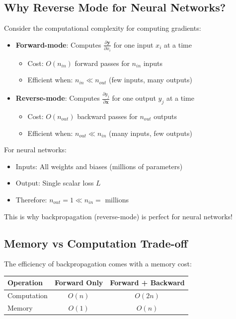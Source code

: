 \documentclass{article}
\begin{document}
\subsection{Why Reverse Mode for Neural Networks?}

Consider the computational complexity for computing gradients:
\begin{itemize}
\item \textbf{Forward-mode}: Computes $\frac{\partial \mathbf{y}}{\partial x_i}$ for one input $x_i$ at a time
\begin{itemize}
\item Cost: $O(n_{in})$ forward passes for $n_{in}$ inputs
\item Efficient when: $n_{in} \ll n_{out}$ (few inputs, many outputs)
\end{itemize}
\item \textbf{Reverse-mode}: Computes $\frac{\partial y_j}{\partial \mathbf{x}}$ for one output $y_j$ at a time
\begin{itemize}
\item Cost: $O(n_{out})$ backward passes for $n_{out}$ outputs
\item Efficient when: $n_{out} \ll n_{in}$ (many inputs, few outputs)
\end{itemize}
\end{itemize}

For neural networks:
\begin{itemize}
\item Inputs: All weights and biases (millions of parameters)
\item Output: Single scalar loss $L$
\item Therefore: $n_{out} = 1 \ll n_{in} = $ millions
\end{itemize}

This is why backpropagation (reverse-mode) is perfect for neural networks!

\subsection{Memory vs Computation Trade-off}

The efficiency of backpropagation comes with a memory cost:

\begin{center}
\begin{tabular}{|l|c|c|}
\hline
\textbf{Operation} & \textbf{Forward Only} & \textbf{Forward + Backward} \\
\hline
Computation & $O(n)$ & $O(2n)$ \\
Memory & $O(1)$ & $O(n)$ \\
\hline
\end{tabular}
\end{center}
\end{document}
